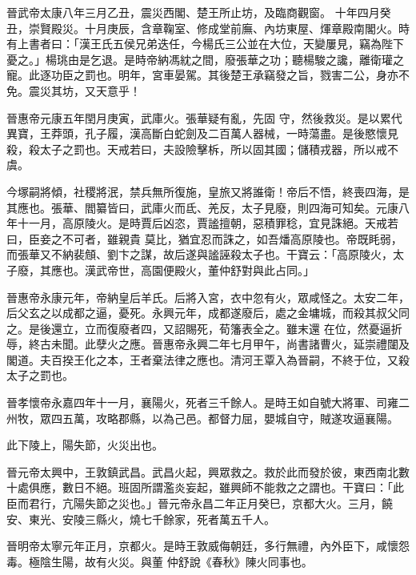 \begin{pinyinscope}
 晉武帝太康八年三月乙丑，震災西閣、楚王所止坊，及臨商觀窗。
 十年四月癸丑，崇賢殿災。十月庚辰，含章鞠室、修成堂前廡、內坊東屋、煇章殿南閣火。時有上書者曰：「漢王氏五侯兄弟迭任，今楊氏三公並在大位，天變屢見，竊為陛下憂之。」楊珧由是乞退。是時帝納馮紞之間，廢張華之功；聽楊駿之讒，離衛瓘之寵。此逐功臣之罰也。明年，宮車晏駕。其後楚王承竊發之旨，戮害二公，身亦不免。震災其坊，又天意乎！



 晉惠帝元康五年閏月庚寅，武庫火。張華疑有亂，先固
 守，然後救災。是以累代異寶，王莽頭，孔子履，漢高斷白蛇劍及二百萬人器械，一時蕩盡。是後愍懷見殺，殺太子之罰也。天戒若曰，夫設險擊柝，所以固其國；儲積戎器，所以戒不虞。



 今塚嗣將傾，社稷將泯，禁兵無所復施，皇旅又將誰衛！帝后不悟，終喪四海，是其應也。張華、閻纂皆曰，武庫火而氐、羌反，太子見廢，則四海可知矣。元康八年十一月，高原陵火。是時賈后凶恣，賈謐擅朝，惡積罪稔，宜見誅絕。天戒若曰，臣妾之不可者，雖親貴
 莫比，猶宜忍而誅之，如吾燔高原陵也。帝既眊弱，而張華又不納裴頠、劉卞之謀，故后遂與謐誣殺太子也。干寶云：「高原陵火，太子廢，其應也。漢武帝世，高園便殿火，董仲舒對與此占同。」



 晉惠帝永康元年，帝納皇后羊氏。后將入宮，衣中忽有火，眾咸怪之。太安二年，后父玄之以成都之逼，憂死。永興元年，成都遂廢后，處之金墉城，而殺其叔父同之。是後還立，立而復廢者四，又詔賜死，荀籓表全之。雖末還
 在位，然憂逼折辱，終古未聞。此孽火之應。晉惠帝永興二年七月甲午，尚書諸曹火，延崇禮闥及閣道。夫百揆王化之本，王者棄法律之應也。清河王覃入為晉嗣，不終于位，又殺太子之罰也。



 晉孝懷帝永嘉四年十一月，襄陽火，死者三千餘人。是時王如自號大將軍、司雍二州牧，眾四五萬，攻略郡縣，以為己邑。都督力屈，嬰城自守，賊遂攻逼襄陽。



 此下陵上，陽失節，火災出也。



 晉元帝太興中，王敦鎮武昌。武昌火起，興眾救之。救於此而發於彼，東西南北數十處俱應，數日不絕。班固所謂濫炎妄起，雖興師不能救之之謂也。干寶曰：「此臣而君行，亢陽失節之災也。」晉元帝永昌二年正月癸巳，京都大火。三月，饒安、東光、安陵三縣火，燒七千餘家，死者萬五千人。



 晉明帝太寧元年正月，京都火。是時王敦威侮朝廷，多行無禮，內外臣下，咸懷怨毒。極陰生陽，故有火災。與董
 仲舒說《春秋》陳火同事也。




\end{pinyinscope}

